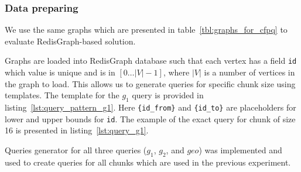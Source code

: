 \subsubsection{Data preparing}

We use the same graphs which are presented in table~\ref{tbl:graphs_for_cfpq} to evaluate RedisGraph-based solution.

Graphs are loaded into RedisGraph database such that each vertex has a field \verb|id| which value is unique and is in $[0 \ldots |V|-1]$, where $|V|$ is a number of vertices in the graph to load.
This allows us to generate queries for specific chunk size using templates.
The template for the $g_1$ query is provided in listing~\ref{lst:query_pattern_g1}.
Here \texttt{\{id\_from\}} and \texttt{\{id\_to\}} are placeholders for lower and upper bounds for \verb|id|. The example of the exact query for chunk of size 16 is presented in listing~\ref{lst:query_g1}.

\begin{algorithm}
\end{algorithm}

\begin{algorithm}
\end{algorithm}

Queries generator for all three queries ($g_1$, $g_2$, and $geo$) was implemented and used to create queries for all chunks which are used in the previous experiment. 


